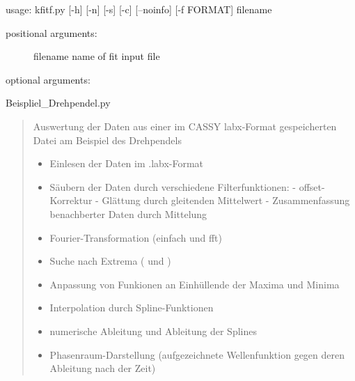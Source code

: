 \documentclass[letterpaper,10pt,english]{sphinxmanual}
\begin{document}
usage: kfitf.py {[}-h{]} {[}-n{]} {[}-s{]} {[}-c{]} {[}--noinfo{]} {[}-f FORMAT{]} filename
\begin{description}
\item[{positional arguments:}] \leavevmode
filename                       name of fit input file

\item[{optional arguments:}] \leavevmode{}

\end{description}
\label{\detokenize{index:module-Beispiel_Drehpendel}}
Beispliel\_Drehpendel.py
\begin{quote}

Auswertung der Daten aus einer im CASSY labx-Format gespeicherten Datei
am Beispiel des Drehpendels
\begin{itemize}
\item {} 
Einlesen der Daten im .labx-Format

\item {} 
Säubern der Daten durch verschiedene Filterfunktionen:
- offset-Korrektur
- Glättung durch gleitenden Mittelwert
- Zusammenfassung benachberter Daten durch Mittelung

\item {} 
Fourier-Transformation (einfach und fft)

\item {} 
Suche nach Extrema ( und )

\item {} 
Anpassung von Funkionen an Einhüllende der Maxima und Minima

\item {} 
Interpolation durch Spline-Funktionen

\item {} 
numerische Ableitung und Ableitung der Splines

\item {} 
Phasenraum-Darstellung (aufgezeichnete Wellenfunktion
gegen deren Ableitung nach der Zeit)

\end{itemize}
\end{quote}
\end{document}
